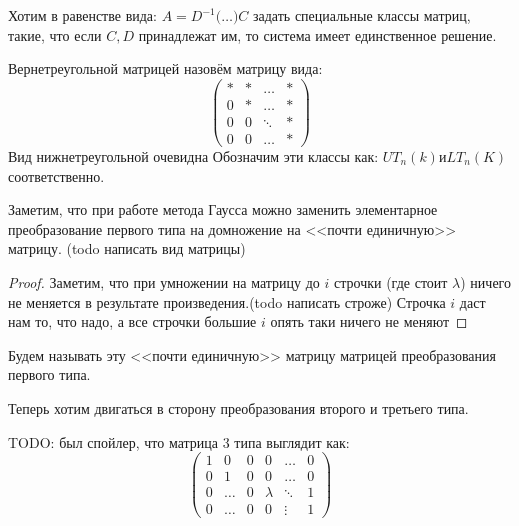 \begin{motivation}
    Хотим в равенстве вида:
    $A = D^{-1}\big(\dots\big)C$
    задать специальные классы матриц, такие, что если
    $C,D$ принадлежат им, то система имеет единственное решение.
\end{motivation}
\begin{definition}
    Вернетреугольной матрицей назовём матрицу вида:$$\begin{pmatrix}
        * & * & \dots & *\\
        0 & * & \dots & *\\
        0 & 0 & \ddots & *\\
        0 & 0 & \dots & *
    \end{pmatrix}
    $$
    Вид нижнетреугольной очевидна
    Обозначим эти классы как: $UT_n(k) \text{и} LT_n(K)$ соответственно.
\end{definition}
\begin{remark}
    Заметим, что при работе метода Гаусса
    можно заменить элементарное преобразование первого типа на 
    домножение на <<почти единичную>> матрицу. (todo написать вид матрицы)
\end{remark}
\begin{proof}
    Заметим, что при умножении на матрицу до $i$ строчки
    (где стоит $\lambda$) ничего не меняется в результате произведения.(todo написать строже)
    Строчка $i$ даст нам то, что надо, а все строчки большие $i$ опять таки
    ничего не меняют
\end{proof}
\begin{definition}
    Будем называть эту <<почти единичную>> матрицу матрицей
    преобразования первого типа.
\end{definition}
\begin{motivation}
    Теперь хотим двигаться в сторону преобразования второго и
    третьего типа.
\end{motivation}
TODO: был спойлер, что матрица 3 типа выглядит как:
$$
\begin{pmatrix}
    1 & 0 & 0 & 0 & \dots & 0\\
    0 & 1 & 0 & 0 & \dots & 0\\
    0 & \dots & 0 & \lambda & \ddots & 1\\
    0 & \dots & 0 & 0 & \vdots & 1
\end{pmatrix}
$$
